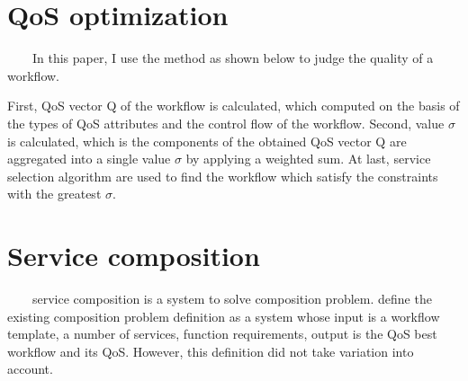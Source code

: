 \documentclass[senior,final,11pt]{iscs-thesis}
\begin{document}
\section{QoS optimization}%
~~~~In this paper, I use the method as shown below to judge the quality of a workflow.

First, QoS vector Q of the workflow is calculated, which computed on the basis of the types of QoS attributes and the control flow of the workflow.
Second, value $\sigma$ is calculated, which is the components of the obtained QoS vector Q are aggregated into a single value $\sigma$ by applying a weighted sum.
At last, service selection algorithm are used to find the workflow which satisfy the constraints with the greatest $\sigma$.

\section{Service composition}
~~~~service composition is a system to solve composition problem. \cite{11} define the existing composition problem definition as a system whose input is a workflow template, a number of services, function requirements, output is the QoS best workflow and its QoS. However, this definition did not take variation into account.
\end{document}
